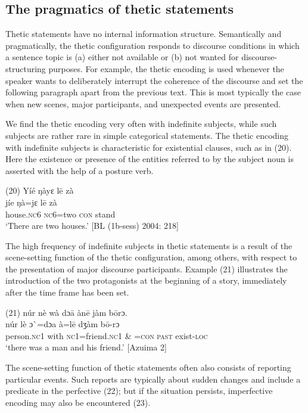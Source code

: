 \documentclass[output=paper]{langsci/langscibook}
\begin{document}
\subsection{The pragmatics of thetic statements} %

Thetic statements have no internal information structure. Semantically and pragmatically, the thetic configuration responds to discourse conditions in which a sentence topic is (a) either not available or (b) not wanted for discourse-structuring purposes. For example, the thetic encoding is used whenever the speaker wants to deliberately interrupt the coherence of the discourse and set the following paragraph apart from the previous text. This is most typically the case when new scenes, major participants, and unexpected events are presented. 

We find the thetic encoding very often with indefinite subjects, while such subjects are rather rare in simple categorical statements. The thetic encoding with indefinite subjects is characteristic for existential clauses, such as in (20). Here the existence or presence of the entities referred to by the subject noun is asserted with the help of a posture verb.

\ea
\glll \textup{(20)}  Yíé    ŋàyɛ    l\={e}  zà\\
  \textup{  jíe    ŋà=jɛ    l\={e}  zà }\\
       house.\textsc{nc}6  \textsc{nc}6=two  \textsc{con}  stand\\
\glt ‘There are two houses.’ [BL (1b-sess) 2004: 218]
\z

The high frequency of indefinite subjects in thetic statements is a result of the scene-setting function of the thetic configuration, among others, with respect to the presentation of major discourse participants. Example (21) illustrates the introduction of the two protagonists at the beginning of a story, immediately after the time frame has been set. 

\ea
\glll \textup{(21)}  núr    nè  wà   dɔ\={a}    àn\={e}    jàm  b\={o}rɔ.\\
  \textup{  núr    lè  }ɔ\`{ }\textup{=dɔa      à=l\={e}    dʒàm  b\={o}-rɔ}\\
       person.\textsc{nc}1  with  \textsc{nc}1=friend.\textsc{nc}1  \& =\textsc{con}  \textsc{past}  exist-\textsc{loc}\\
\glt ‘there was a man and his friend.’ [Azuima 2]
\z

The scene-setting function of thetic statements often also consists of reporting particular events. Such reports are typically about sudden changes and include a predicate in the perfective (22); but if the situation persists, imperfective encoding may also be encountered (23).
\end{document}
